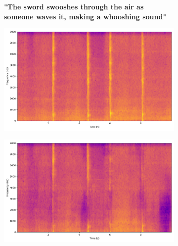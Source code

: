 \begin{figure}[htbp]
    
    \begin{subfigure}[b]{0.185\textwidth}
        \centering
        \scriptsize\textbf{"The sword swooshes through the air as someone waves it, making a whooshing sound"}
        \vspace{5.0mm}
    \end{subfigure}
    \begin{subfigure}[b]{0.185\textwidth}
        \centering
        \includegraphics[width=\textwidth]{plots/sword_swoosh/clap mixture_spectrogram.png}
        \centering
    \end{subfigure}
    \begin{subfigure}[b]{0.185\textwidth}
        \centering
        \includegraphics[width=\textwidth]{plots/sword_swoosh/onepeace sep_spectrogram.png}
    \end{subfigure}
    \begin{subfigure}[b]{0.185\textwidth}
        \centering

\end{subfigure}
\end{figure}
